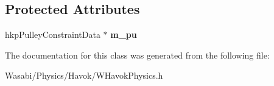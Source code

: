 \subsection*{Protected Attributes}
\begin{DoxyCompactItemize}
\item 
hkp\+Pulley\+Constraint\+Data $\ast$ {\bfseries m\+\_\+pu}\hypertarget{class_w_pulley_a468c611c9193de5247d3bd4ee397cf20}{}\label{class_w_pulley_a468c611c9193de5247d3bd4ee397cf20}

\end{DoxyCompactItemize}


The documentation for this class was generated from the following file\+:\begin{DoxyCompactItemize}
\item 
Wasabi/\+Physics/\+Havok/W\+Havok\+Physics.\+h\end{DoxyCompactItemize}
